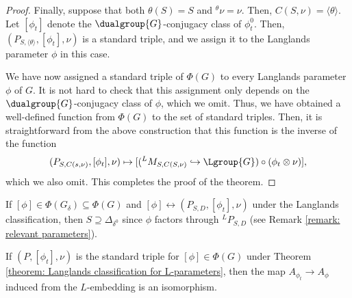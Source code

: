 \documentclass[11pt,letterpaper]{amsart}
\numberwithin{equation}{section}
\begin{document}
\begin{proof}
    Finally, suppose that both $\theta(S)=S$ and ${}^\theta\nu= \nu$. Then, $C(S,\nu)= \langle \theta \rangle$. Let $[\phi_t]$ denote the $\dualgroup{G}$-conjugacy class of $\phi_t^0$. Then, $(P_{S,\langle \theta \rangle}, [\phi_t], \nu)$ is a standard triple, and we assign it to the Langlands parameter $\phi$ in this case.

  We have now assigned a standard triple of $\Phi(G)$ to every Langlands parameter $\phi$ of $G$. It is not hard to check that this assignment only depends on the $\dualgroup{G}$-conjugacy class of $\phi$, which we omit. Thus, we have obtained a well-defined function from $\Phi(G)$ to the set of standard triples. Then, it is straightforward from the above construction that this function is the inverse of the function 
  \[ (P_{S,C(s,\nu)}, [\phi_t],\nu) \mapsto [ ({}^LM_{S,C(S,\nu)} \hookrightarrow \Lgroup{G}) \circ (\phi_t \otimes \nu)], \]
 which we also omit. This completes the proof of the theorem.  
\end{proof}


\begin{remark}\label{remark: LC for L-parameters of pure inner forms}
    If $[\phi] \in \Phi(G_{\delta}) \subseteq \Phi(G)$ and $[\phi] \leftrightarrow (P_{S,D}, [\phi_t], \nu)$ under the Langlands classification, then $S \supseteq \Delta_{\delta^0}$ since $\phi$ factors through ${}^LP_{S,D}$ (see Remark \ref{remark: relevant parameters}). 
\end{remark}

\begin{lemma}\label{lemma: LC for enhanced parameters}
         If  $(P,[\phi_t],\nu)$ is the standard triple for $[\phi]\in \Phi(G)$ under Theorem \ref{theorem: Langlands classification for L-parameters}, then the map $ A_{\phi_t} \to A_\phi$ induced from the $L$-embedding is an isomorphism.
\end{lemma}
\end{document}

